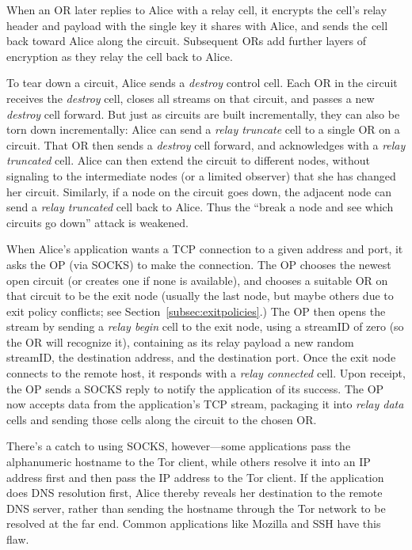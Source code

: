 \documentclass[times,10pt,twocolumn]{article}
\begin{document}
When an OR later replies to Alice with a relay cell, it
encrypts the cell's relay header and payload with the single key it
shares with Alice, and sends the cell back toward Alice along the
circuit.  Subsequent ORs add further layers of encryption as they
relay the cell back to Alice.

To tear down a circuit, Alice sends a \emph{destroy} control
cell. Each OR in the circuit receives the \emph{destroy} cell, closes
all streams on that circuit, and passes a new \emph{destroy} cell
forward. But just as circuits are built incrementally, they can also
be torn down incrementally: Alice can send a \emph{relay
truncate} cell to a single OR on a circuit. That OR then sends a
\emph{destroy} cell forward, and acknowledges with a
\emph{relay truncated} cell. Alice can then extend the circuit to
different nodes, without signaling to the intermediate nodes (or
a limited observer) that she has changed her circuit.
Similarly, if a node on the circuit goes down, the adjacent
node can send a \emph{relay truncated} cell back to Alice.  Thus the
``break a node and see which circuits go down'' attack
\cite{freedom21-security} is weakened.

\label{subsec:tcp}

When Alice's application wants a TCP connection to a given
address and port, it asks the OP (via SOCKS) to make the
connection. The OP chooses the newest open circuit (or creates one if
none is available), and chooses a suitable OR on that circuit to be the
exit node (usually the last node, but maybe others due to exit policy
conflicts; see Section~\ref{subsec:exitpolicies}.) The OP then opens
the stream by sending a \emph{relay begin} cell to the exit node,
using a streamID of zero (so the OR will recognize it), containing as
its relay payload a new random streamID, the destination
address, and the destination port.  Once the
exit node connects to the remote host, it responds
with a \emph{relay connected} cell.  Upon receipt, the OP sends a
SOCKS reply to notify the application of its success. The OP
now accepts data from the application's TCP stream, packaging it into
\emph{relay data} cells and sending those cells along the circuit to
the chosen OR.

There's a catch to using SOCKS, however---some applications pass the
alphanumeric hostname to the Tor client, while others resolve it into
an IP address first and then pass the IP address to the Tor client. If
the application does DNS resolution first, Alice thereby reveals her
destination to the remote DNS server, rather than sending the hostname
through the Tor network to be resolved at the far end. Common applications
like Mozilla and SSH have this flaw.
\end{document}
